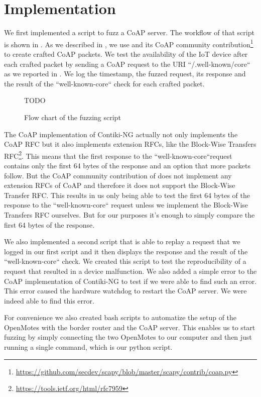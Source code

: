 \section{Implementation}
\label{section:implementation}


We first implemented a script to fuzz a CoAP server. The workflow of that script is shown in . As we described in , we use \scapy and its CoAP community contribution\footnote{\url{https://github.com/secdev/scapy/blob/master/scapy/contrib/coap.py}} to create crafted CoAP packets. We test the availability of the IoT device after each crafted packet by sending a CoAP request to the URI ``/.well-known/core`` as we reported in . We log the timestamp, the fuzzed request, its response and the result of the ``well-known-core`` check for each crafted packet.

\begin{figure}[h]
		\centering
		TODO
		\caption{Flow chart of the fuzzing script}
		\label{figure:fuzz_flow_chart}
\end{figure}

The CoAP implementation of Contiki-NG actually not only implements the CoAP RFC but it also implements extension RFCs, like the Block-Wise Transfers RFC\footnote{\url{https://tools.ietf.org/html/rfc7959}}. This means that the first response to the ``well-known-core``request contains only the first 64 bytes of the response and an option that more packets follow. But the CoAP community contribution of \scapy does not implement any extension RFCs of CoAP and therefore it does not support the Block-Wise Transfer RFC. This results in us only being able to test the first 64 bytes of the response to the ``well-known-core`` request unless we implement the Block-Wise Transfers RFC ourselves. But for our purposes it's enough to simply compare the first 64 bytes of the response.

We also implemented a second script that is able to replay a request that we logged in our first script and it then displays the response and the result of the ``well-known-core`` check. We created this script to test the reproducibility of a request that resulted in a device malfunction. We also added a simple error to the CoAP implementation of Contiki-NG to test if we were able to find such an error. This error caused the hardware watchdog to restart the CoAP server. We were indeed able to find this error.

For convenience we also created bash scripts to automatize the setup of the OpenMotes with the border router and the CoAP server. This enables us to start fuzzing by simply connecting the two OpenMotes to our computer and then just running a single command, which is our python script.
